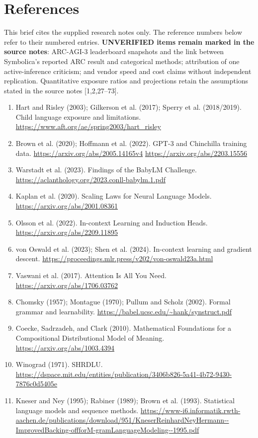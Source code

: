 \section*{References}
This brief cites the supplied research notes only. The reference numbers below refer to their numbered entries. \textbf{UNVERIFIED items remain marked in the source notes}: ARC-AGI-3 leaderboard snapshots and the link between Symbolica's reported ARC result and categorical methods; attribution of one active-inference criticism; and vendor speed and cost claims without independent replication. Quantitative exposure ratios and projections retain the assumptions stated in the source notes [1,2,27--73].

\begin{enumerate}[leftmargin=*,itemsep=2pt]
\item Hart and Risley (2003); Gilkerson et al. (2017); Sperry et al. (2018/2019). Child language exposure and limitations. \url{https://www.aft.org/ae/spring2003/hart_risley}
\item Brown et al. (2020); Hoffmann et al. (2022). GPT-3 and Chinchilla training data. \url{https://arxiv.org/abs/2005.14165v4} \url{https://arxiv.org/abs/2203.15556}
\item Warstadt et al. (2023). Findings of the BabyLM Challenge. \url{https://aclanthology.org/2023.conll-babylm.1.pdf}
\item Kaplan et al. (2020). Scaling Laws for Neural Language Models. \url{https://arxiv.org/abs/2001.08361}
\item Olsson et al. (2022). In-context Learning and Induction Heads. \url{https://arxiv.org/abs/2209.11895}
\item von Oswald et al. (2023); Shen et al. (2024). In-context learning and gradient descent. \url{https://proceedings.mlr.press/v202/von-oswald23a.html}
\item Vaswani et al. (2017). Attention Is All You Need. \url{https://arxiv.org/abs/1706.03762}
\item Chomsky (1957); Montague (1970); Pullum and Scholz (2002). Formal grammar and learnability. \url{https://babel.ucsc.edu/~hank/synstruct.pdf}
\item Coecke, Sadrzadeh, and Clark (2010). Mathematical Foundations for a Compositional Distributional Model of Meaning. \url{https://arxiv.org/abs/1003.4394}
\item Winograd (1971). SHRDLU. \url{https://dspace.mit.edu/entities/publication/3406b826-5a41-4b72-9430-7876c0d5405e}
\item Kneser and Ney (1995); Rabiner (1989); Brown et al. (1993). Statistical language models and sequence methods. \url{https://www-i6.informatik.rwth-aachen.de/publications/download/951/KneserReinhardNeyHermann--ImprovedBacking-offforM-gramLanguageModeling--1995.pdf}

\end{enumerate}
